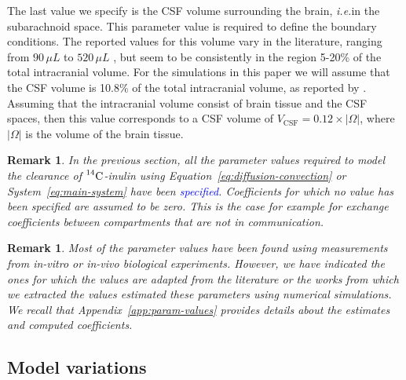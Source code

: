 \documentclass[10pt]{article}
\newcommand{\ie}{\emph{i.e.}\;}
\newcommand{\1}{^{(1)}}
\newcommand{\2}{^{(2)}}
\newcommand{\Cinulin}{$\prescript{14}{}{\text{C}}$-inulin }
\newtheorem{remark}[theorem]{Remark}
\newcommand{\corr}[1]{\textcolor{blue}{#1}}
\begin{document}
The last value we specify is the CSF volume surrounding the brain, \ie in the subarachnoid space. This parameter value is required to define the boundary conditions.  
The reported values for this volume vary in the literature, ranging from $90 \, \si{\mu L}$ \cite{pardridge2011drug} to $520 \, \si{\mu L}$ \cite{lai1983sampling}, but seem to be consistently in the region 5-20\% of the total intracranial volume. For the simulations in this paper we will assume that the CSF volume is 10.8\% of the total intracranial volume, as reported by \cite{murtha2014cerebrospinal}. Assuming that the intracranial volume consist of brain tissue and the CSF spaces, then this value corresponds to a CSF volume of $V_\text{CSF} = 0.12\times |\Omega|$, where $|\Omega|$ is the volume of the brain tissue.

\begin{remark}
In the previous section, all the parameter values required to model the clearance of \Cinulin using Equation~\eqref{eq:diffusion-convection} or System~\eqref{eq:main-system} have been \corr{specified}. Coefficients for which no value has been specified are assumed to be zero. This is the case for example for exchange coefficients between compartments that are not in communication.
\end{remark}

\begin{remark}
Most of the parameter values have been found using measurements from \textit{in-vitro} or \textit{in-vivo} biological experiments. However, we have indicated the ones for which the values are adapted from the literature or the works from which we extracted the values estimated these parameters using numerical simulations. We recall that Appendix~\ref{app:param-values} provides details about the estimates and computed coefficients.
\end{remark}

\subsection{Model variations}\label{subsec:var}
\end{document}
